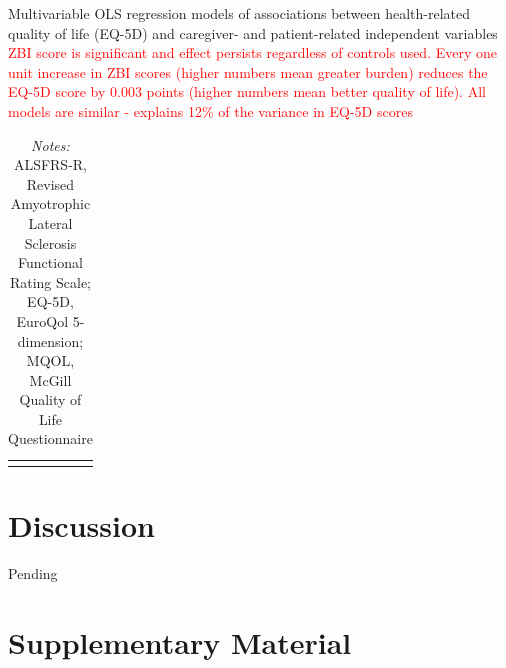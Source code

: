 \documentclass[12pt]{article}
\begin{document}
\begin{table}[H]
    \centering \singlespacing \small
    \caption{Multivariable OLS regression models of associations between health-related quality of life (EQ-5D) and caregiver- and patient-related independent variables \\
    \textcolor{red}{ZBI score is significant and effect persists regardless of controls used. Every one unit increase in ZBI scores (higher numbers mean greater burden) reduces the EQ-5D score by 0.003 points (higher numbers mean better quality of life). All models are similar - explains 12\% of the variance in EQ-5D scores}}
    \begin{tabular}{|L{5cm}|R{1.6cm}|R{1.6cm}|R{1.6cm}|R{1.6cm}|R{1.6cm}|}
        \hline
    \end{tabular}
    \label{tab_multiOLS_eq5d}
    \caption*{\footnotesize 
                \textit{Notes:} ALSFRS-R, Revised Amyotrophic Lateral Sclerosis Functional Rating Scale; EQ-5D, EuroQol 5-dimension; MQOL, McGill Quality of Life Questionnaire}
\end{table}


\section*{Discussion} %
Pending


\clearpage
\section*{Supplementary Material} %


\setcounter{table}{0}
\renewcommand{\thetable}{S\arabic{table}}

\setcounter{figure}{0}
\renewcommand{\thefigure}{S\arabic{figure}}
\end{document}
